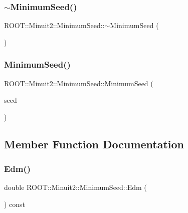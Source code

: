 \subsubsection{\texorpdfstring{$\sim$MinimumSeed()}{~MinimumSeed()}\hspace{0.1cm}{\footnotesize\ttfamily [3/3]}}
{\footnotesize\ttfamily R\+O\+O\+T\+::\+Minuit2\+::\+Minimum\+Seed\+::$\sim$\+Minimum\+Seed (\begin{DoxyParamCaption}{ }\end{DoxyParamCaption})\hspace{0.3cm}{\ttfamily [inline]}}

\mbox{\label{classROOT_1_1Minuit2_1_1MinimumSeed_a720f1ac742c7c9c8425bad7b4dc7dd12}} 
\subsubsection{\texorpdfstring{MinimumSeed()}{MinimumSeed()}\hspace{0.1cm}{\footnotesize\ttfamily [6/6]}}
{\footnotesize\ttfamily R\+O\+O\+T\+::\+Minuit2\+::\+Minimum\+Seed\+::\+Minimum\+Seed (\begin{DoxyParamCaption}\item[{const \mbox{\hyperlink{classROOT_1_1Minuit2_1_1MinimumSeed}{Minimum\+Seed}} \&}]{seed }\end{DoxyParamCaption})\hspace{0.3cm}{\ttfamily [inline]}}



\subsection{Member Function Documentation}
\mbox{\label{classROOT_1_1Minuit2_1_1MinimumSeed_ab378accd110c0313557d3e916e2a9282}} 
\subsubsection{\texorpdfstring{Edm()}{Edm()}\hspace{0.1cm}{\footnotesize\ttfamily [1/3]}}
{\footnotesize\ttfamily double R\+O\+O\+T\+::\+Minuit2\+::\+Minimum\+Seed\+::\+Edm (\begin{DoxyParamCaption}{ }\end{DoxyParamCaption}) const\hspace{0.3cm}{\ttfamily [inline]}}

